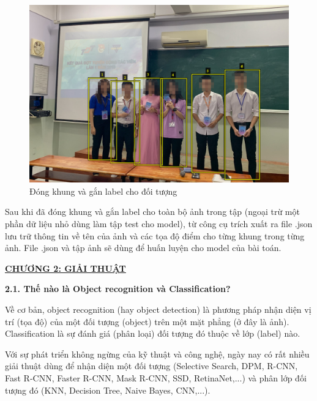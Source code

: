 \documentclass{report}
\begin{document}
\begin{figure}[h!]
	\includegraphics[scale=0.3]{2.png}
	\caption{Đóng khung và gắn label cho đối tượng}
\end{figure}

Sau khi đã đóng khung và gắn label cho toàn bộ ảnh trong tập (ngoại trừ một phần dữ liệu nhỏ dùng làm tập test cho model), từ công cụ trích xuất ra file .json lưu trữ thông tin về tên của ảnh và các tọa độ điểm cho từng khung trong từng ảnh. File .json và tập ảnh sẽ dùng để huấn luyện cho model của bài toán.



\newpage
\changefontsizes{16pt}
\centerline{\textbf{\hyperlink{page.7}{CHƯƠNG 2: GIẢI THUẬT}}}



\bigskip
\changefontsizes{14pt}
\setlength{\parindent}{0.0cm}
\textbf{2.1. Thế nào là Object recognition và Classification?}

\smallskip
\changefontsizes{13pt}
\setlength{\parindent}{1cm}

Về cơ bản, object recognition (hay object detection) là phương pháp nhận diện vị trí (tọa độ) của một đối tượng (object) trên một mặt phẳng (ở đây là ảnh). Classification là sự đánh giá (phân loại) đối tượng đó thuộc về lớp (label) nào. 

Với sự phát triển không ngừng của kỹ thuật và công nghệ, ngày nay có rất nhiều giải thuật dùng để nhận diện một đối tượng (Selective Search, DPM, R-CNN, Fast R-CNN, Faster R-CNN, Mask R-CNN, SSD, RetinaNet,...) và phân lớp đối tượng đó (KNN, Decision Tree, Naive Bayes, CNN,...).
\end{document}
